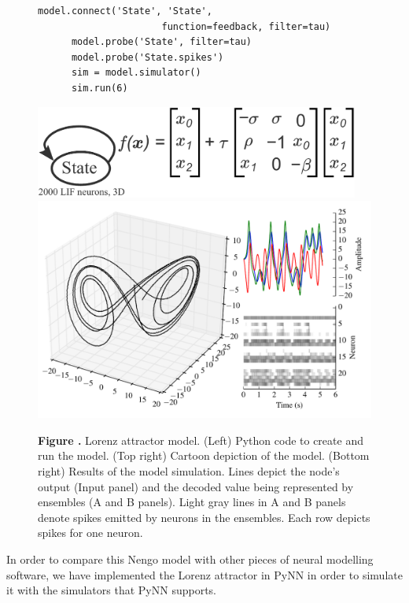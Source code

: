 \documentclass{frontiersSCNS}
\begin{document}
\begin{figure}
\begin{center}
\begin{minipage}{0.43\textwidth}
\begin{lstlisting}[basicstyle={\footnotesize\ttfamily}]
      model.connect('State', 'State',
                      function=feedback, filter=tau)
      model.probe('State', filter=tau)
      model.probe('State.spikes')
      sim = model.simulator()
      sim.run(6)
    \end{lstlisting}
  \end{minipage}
  \begin{minipage}{0.55\textwidth}
    \includegraphics[width=0.95\textwidth]{lorenz}
    \includegraphics[width=\textwidth]{lorenz_res}
  \end{minipage}
\end{center}
 \textbf{\label{fig:lorenz} Figure .}{
   Lorenz attractor model. (Left) Python code to create and run the model.
   (Top right) Cartoon depiction of the model.
   (Bottom right) Results of the model simulation. Lines depict
   the node's output (Input panel) and the decoded value being represented
   by ensembles (A and B panels). Light gray lines in A and B panels denote
   spikes emitted by neurons in the ensembles. Each row depicts spikes
   for one neuron.}
\end{figure}

In order to compare this Nengo model
with other pieces of neural modelling software,
we have implemented the Lorenz attractor
in PyNN \cite{TODO} in order to simulate it
with the simulators that PyNN supports.
\end{document}

